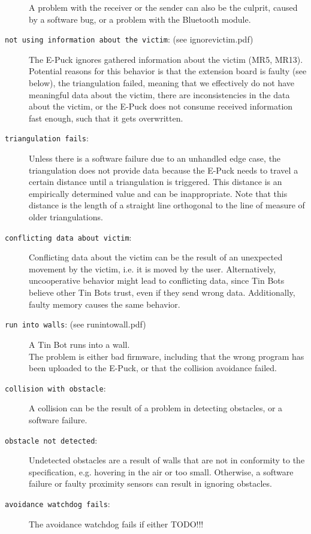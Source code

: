 \documentclass[a4paper,parskip,headheight=38pt]{scrartcl} %
\begin{document}
\begin{description}
    A problem with the receiver or the sender can also be the culprit, caused by a software bug, or a problem with the Bluetooth module. %
\item[\texttt{not using information about the victim}: (see ignorevictim.pdf)]
    The E-Puck ignores gathered information about the victim (MR5, MR13). \\
    Potential reasons for this behavior is that the extension board is faulty (see below), the triangulation failed, meaning that we effectively do not have meaningful data about the victim, there are inconsistencies in the data about the victim, or the E-Puck does not consume received information fast enough, such that it gets overwritten.
\item[\texttt{triangulation fails}:]
    Unless there is a software failure due to an unhandled edge case, the triangulation does not provide data because the E-Puck needs to travel a certain distance until a triangulation is triggered. 
    This distance is an empirically determined value and can be inappropriate. 
    Note that this distance is the length of a straight line orthogonal to the line of measure of older triangulations.
\item[\texttt{conflicting data about victim}:]
    Conflicting data about the victim can be the result of an unexpected movement by the victim, i.e. it is moved by the user. 
    Alternatively, uncooperative behavior might lead to conflicting data, since Tin Bots believe other Tin Bots trust, even if they send wrong data. 
    Additionally, faulty memory causes the same behavior.
\item[\texttt{run into walls}: (see runintowall.pdf)]
    A Tin Bot runs into a wall.\\
    The problem is either bad firmware, including that the wrong program has been uploaded to the E-Puck, or that the collision avoidance failed.
\item[\texttt{collision with obstacle}:]
    A collision can be the result of a problem in detecting obstacles, or a software failure.
\item[\texttt{obstacle not detected}:]
    Undetected obstacles are a result of walls that are not in conformity to the specification, e.g. hovering in the air or too small. 
    Otherwise, a software failure or faulty proximity sensors can result in ignoring obstacles.
\item[\texttt{avoidance watchdog fails}:]
    The avoidance watchdog fails if either TODO!!!

\end{description}
\end{document}
